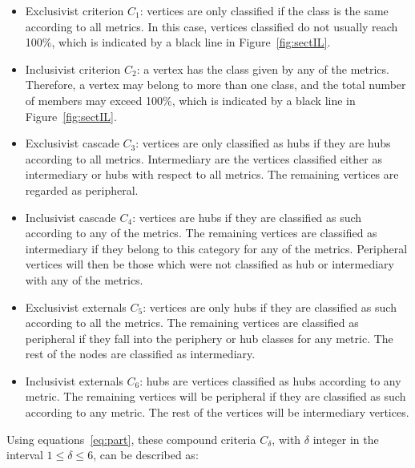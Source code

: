 \documentclass[%
	aip,
	jmp,%
	amsmath,amssymb,
	reprint,%
]{revtex4-1}
\begin{document}
\begin{itemize}
	\item Exclusivist criterion $C_1$:  vertices are only classified if the class is the same according to all metrics. In this case, vertices classified do not usually reach 100\%, which is indicated by a black line in Figure~\ref{fig:sectIL}.
	\item Inclusivist criterion $C_2$: a vertex has the class given by any of the metrics. Therefore, a vertex may belong to more than one class, and the total number of members may exceed 100\%, which is indicated by a black line in Figure~\ref{fig:sectIL}.
	\item Exclusivist cascade $C_3$: vertices are only classified as hubs if they are hubs according to all metrics. Intermediary are the vertices classified either as intermediary or hubs with respect to all metrics. The remaining vertices are regarded as peripheral.
	\item Inclusivist cascade $C_4$: vertices are hubs if they are classified as such according to any of the metrics. The remaining vertices are classified as intermediary if they belong to this category for any of the metrics. Peripheral vertices will then be those which were not classified as hub or intermediary with any of the metrics. 
	\item Exclusivist externals $C_5$: vertices are only hubs if they are classified as such according to all the metrics. The remaining vertices are classified as peripheral if they fall into the periphery or hub classes for any metric. The rest of the nodes are classified as intermediary.
	\item Inclusivist externals $C_6$: hubs are vertices classified as hubs according to any metric. The remaining vertices will be peripheral if they are classified as such according to any metric. The rest of the vertices will be intermediary vertices.
\end{itemize}

Using equations~\ref{eq:part}, these compound criteria $C_\delta$, with $\delta$ integer in the interval $1\leq\delta\leq6$, can be described as:
\end{document}
